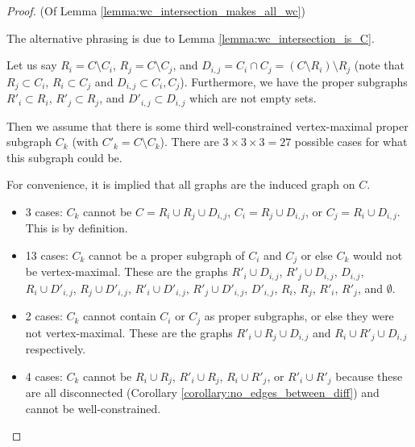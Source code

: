 \begin{proof} (Of Lemma \ref{lemma:wc_intersection_makes_all_wc})

The alternative phrasing is due to Lemma \ref{lemma:wc_intersection_is_C}.

Let us say $R_i=C\setminus C_i$, $R_j=C\setminus C_j$, and $D_{i,j}=C_i\cap C_j=(C\setminus R_i)\setminus R_j$ (note that $R_j\subset C_i$, $R_i\subset C_j$ and $D_{i,j}\subset C_i,C_j$). Furthermore, we have the proper subgraphs $R'_i\subset R_i$, $R'_j\subset R_j$, and $D'_{i,j}\subset D_{i,j}$ which are not empty sets.

Then we assume that there is some third well-constrained vertex-maximal proper subgraph $C_k$ (with $C'_k=C\setminus C_k$). There are $3\times 3\times 3 = 27$ possible cases for what this subgraph could be.

For convenience, it is implied that all graphs are the induced graph on $C$.
\newcommand{\inducedOnC}[1]{#1}


\begin{itemize}
    \item 3 cases: $C_k$ cannot be $C=\inducedOnC{R_i\cup R_j\cup D_{i,j}}$, $C_i=\inducedOnC{R_j\cup D_{i,j}}$, or $C_j=\inducedOnC{R_i\cup D_{i,j}}$. This is by definition.

    \item 13 cases: $C_k$ cannot be a proper subgraph of $C_i$ and $C_j$ or else $C_k$ would not be vertex-maximal. These are the graphs $\inducedOnC{R'_i\cup D_{i,j}}$, $\inducedOnC{R'_j\cup D_{i,j}}$, $\inducedOnC{ D_{i,j}}$, $\inducedOnC{R_i\cup D'_{i,j}}$, $\inducedOnC{R_j\cup D'_{i,j}}$, $\inducedOnC{R'_i\cup D'_{i,j}}$, $\inducedOnC{R'_j\cup D'_{i,j}}$, $\inducedOnC{ D'_{i,j}}$, $\inducedOnC{R_i}$, $\inducedOnC{R_j}$, $\inducedOnC{R'_i}$, $\inducedOnC{R'_j}$, and $\inducedOnC{\emptyset}$.

    \item 2 cases: $C_k$ cannot contain $C_i$ or $C_j$ as proper subgraphs, or else they were not vertex-maximal. These are the graphs $\inducedOnC{R'_i\cup R_j\cup D_{i,j}}$ and $\inducedOnC{R_i\cup R'_j\cup D_{i,j}}$ respectively.

    \item 4 cases:  $C_k$ cannot be $\inducedOnC{R_i\cup R_j}$, $\inducedOnC{R'_i\cup R_j}$, $\inducedOnC{R_i\cup R'_j}$, or $\inducedOnC{R'_i\cup R'_j}$ because these are all disconnected (Corollary \ref{corollary:no_edges_between_diff}) and cannot be well-constrained.


\end{itemize}
\end{proof}
